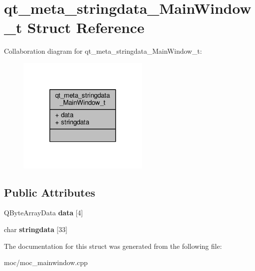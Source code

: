 \hypertarget{structqt__meta__stringdata___main_window__t}{\section{qt\-\_\-meta\-\_\-stringdata\-\_\-\-Main\-Window\-\_\-t Struct Reference}
\label{structqt__meta__stringdata___main_window__t}
}


Collaboration diagram for qt\-\_\-meta\-\_\-stringdata\-\_\-\-Main\-Window\-\_\-t\-:\nopagebreak
\begin{figure}[H]
\begin{center}
\leavevmode
\includegraphics[width=180pt]{structqt__meta__stringdata___main_window__t__coll__graph}
\end{center}
\end{figure}
\subsection*{Public Attributes}
\begin{DoxyCompactItemize}
\item 
\hypertarget{structqt__meta__stringdata___main_window__t_a332d7fa058028f7613b5ba68abb5a7fe}{Q\-Byte\-Array\-Data {\bfseries data} \mbox{[}4\mbox{]}}\label{structqt__meta__stringdata___main_window__t_a332d7fa058028f7613b5ba68abb5a7fe}

\item 
\hypertarget{structqt__meta__stringdata___main_window__t_a8680db759276041c75c0659f4ae8e63c}{char {\bfseries stringdata} \mbox{[}33\mbox{]}}\label{structqt__meta__stringdata___main_window__t_a8680db759276041c75c0659f4ae8e63c}

\end{DoxyCompactItemize}


The documentation for this struct was generated from the following file\-:\begin{DoxyCompactItemize}
\item 
moc/moc\-\_\-mainwindow.\-cpp\end{DoxyCompactItemize}
